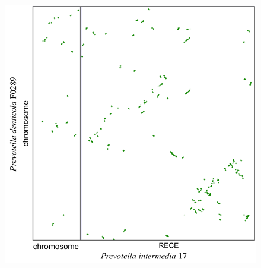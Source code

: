 \begin{figure}[H]
\begin{center}
\begin{minipage}{0.5\textwidth}
   \label{figsyntprev1}
    \end{minipage}
  \begin{minipage}{0.5\textwidth}
  \hspace{1cm}
   \includegraphics[width=1.1\textwidth]{./img/synteny/new/fig8_15b.png}
   \hspace{2cm}
   \label{figsyntprev2}
    \end{minipage}
    \\
    \begin{minipage}{0.5\textwidth}

\end{minipage}
\end{center}
\end{figure}
